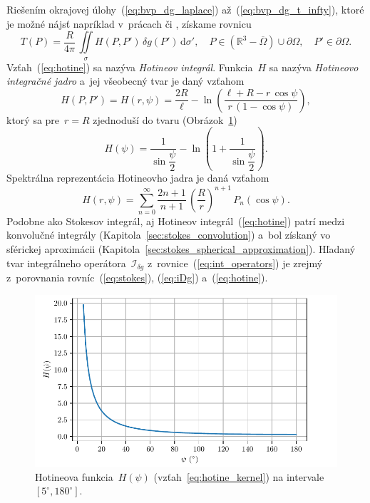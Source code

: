 \documentclass[a4paper, 12pt]{book}
\newcommand{\diff}{\mathrm d}
\begin{document}
Riešením okrajovej úlohy~(\ref{eq:bvp_dg_laplace}) 
až~(\ref{eq:bvp_dg_t_infty}), ktoré je možné nájsť napríklad v~prácach 
\textcite{MoritzPhysicalGeodesy} či \textcite{SansoGeoidDetermination}, získame 
rovnicu
%
\begin{equation}
\label{eq:hotine}
T(P) = \frac{R}{4\pi} \, \iint\limits_{\sigma} H(P, P') \, \delta g(P') \, 
\diff \sigma'{,} \quad P \in \left( \mathbb{R}^3 - \overline\Omega \right) \cup 
\partial\Omega{,} \quad P' \in \partial\Omega{.}
\end{equation}
%
Vzťah~(\ref{eq:hotine}) sa nazýva \emph{Hotineov integrál}.  Funkcia~$H$ sa 
nazýva \emph{Hotineovo integračné jadro} a~jej všeobecný tvar je daný vzťahom 
\parencite{SansoGeoidDetermination}
%
\begin{equation}
\label{eq:hotine_kernel_general}
H(P, P') = H(r, \psi) = \frac{2R}{\ell} - \ln\left(\frac{\ell + R - r \, 
\cos\psi}{r \, (1 - \cos\psi)}\right){,}
\end{equation}
%
ktorý sa pre~$r = R$ zjednoduší do tvaru (Obrázok~\ref{fig:hotine_kernel})
%
\begin{equation}
\label{eq:hotine_kernel}
H(\psi) = \frac{1}{\sin\dfrac{\psi}{2}} - \ln\left( 
1 + \frac{1}{\sin\dfrac{\psi}{2}} \right){.}
\end{equation}
%
Spektrálna reprezentácia Hotineovho jadra je daná vzťahom
%
\begin{equation}
\label{eq:hotine_spectral}
H(r, \psi) = \sum_{n = 0}^{\infty} \frac{2n + 1}{n + 1} \, \left( \frac{R}{r} 
\right)^{n + 1} \, P_n(\cos\psi){.}
\end{equation}
%
Podobne ako Stokesov integrál, aj Hotineov integrál~(\ref{eq:hotine}) patrí 
medzi konvolučné integrály (Kapitola~\ref{sec:stokes_convolution}) a~bol 
získaný vo sférickej aproximácii 
(Kapitola~\ref{sec:stokes_spherical_approximation}).  Hľadaný tvar integrálneho 
operátora~$\mathcal{I}_{\delta g}$ z~rovnice~(\ref{eq:int_operators}) je zrejmý 
z~porovnania rovníc~(\ref{eq:stokes}), (\ref{eq:iDg}) a~(\ref{eq:hotine}).

\begin{figure}[bt]
\centering
\includegraphics{./fig-hotine-kernel.pdf}
\caption{Hotineova funkcia~$H(\psi)$ (vzťah~\ref{eq:hotine_kernel}) na 
intervale~$[5^\circ, 180^\circ]$.}
\label{fig:hotine_kernel}
\end{figure}
\end{document}
